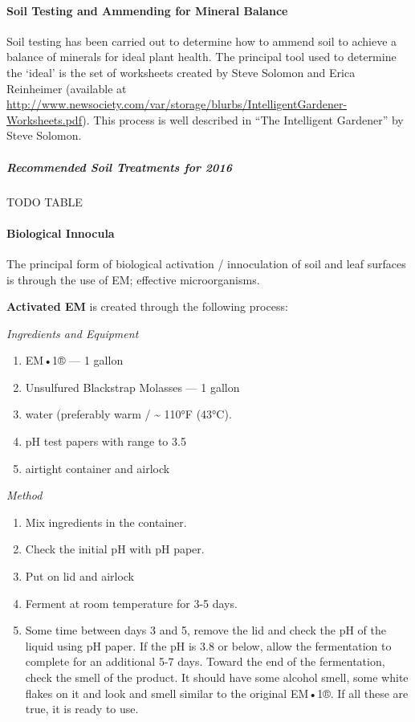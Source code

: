 \paragraph{Soil Testing and Ammending for Mineral
Balance}\label{soil-testing-and-ammending-for-mineral-balance}

Soil testing has been carried out to determine how to ammend soil to
achieve a balance of minerals for ideal plant health. The principal tool
used to determine the `ideal' is the set of worksheets created by Steve
Solomon and Erica Reinheimer (available at
\url{http://www.newsociety.com/var/storage/blurbs/IntelligentGardener-Worksheets.pdf}).
This process is well described in ``The Intelligent Gardener'' by Steve
Solomon.

\subparagraph{Recommended Soil Treatments for
2016}\label{recommended-soil-treatments-for-2016}

TODO TABLE

\paragraph{Biological Innocula}\label{biological-innocula}

The principal form of biological activation / innoculation of soil and
leaf surfaces is through the use of EM; effective microorganisms.

\textbf{Activated EM} is created through the following process:

\emph{Ingredients and Equipment}

\begin{enumerate}
\def\labelenumi{\arabic{enumi}.}
\itemsep1pt\parskip0pt
\item
  EM•1® --- 1 gallon
\item
  Unsulfured Blackstrap Molasses --- 1 gallon
\item
  water (preferably warm / \textasciitilde{} 110°F (43°C).
\item
  pH test papers with range to 3.5
\item
  airtight container and airlock
\end{enumerate}

\emph{Method}

\begin{enumerate}
\def\labelenumi{\arabic{enumi}.}
\itemsep1pt\parskip0pt
\item
  Mix ingredients in the container.
\item
  Check the initial pH with pH paper.
\item
  Put on lid and airlock
\item
  Ferment at room temperature for 3-5 days.
\item
  Some time between days 3 and 5, remove the lid and check the pH of the
  liquid using pH paper. If the pH is 3.8 or below, allow the
  fermentation to complete for an additional 5-7 days. Toward the end of
  the fermentation, check the smell of the product. It should have some
  alcohol smell, some white flakes on it and look and smell similar to
  the original EM•1®. If all these are true, it is ready to use.
\end{enumerate}

